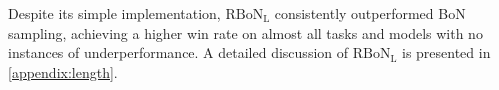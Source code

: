 Despite its simple implementation, $\mathrm{RBoN}_{\mathrm{L}}$ consistently outperformed BoN sampling, achieving a higher win rate on almost all tasks and models with no instances of underperformance. A detailed discussion of $\mathrm{RBoN}_{\mathrm{L}}$ is presented in \cref{appendix:length}. 



